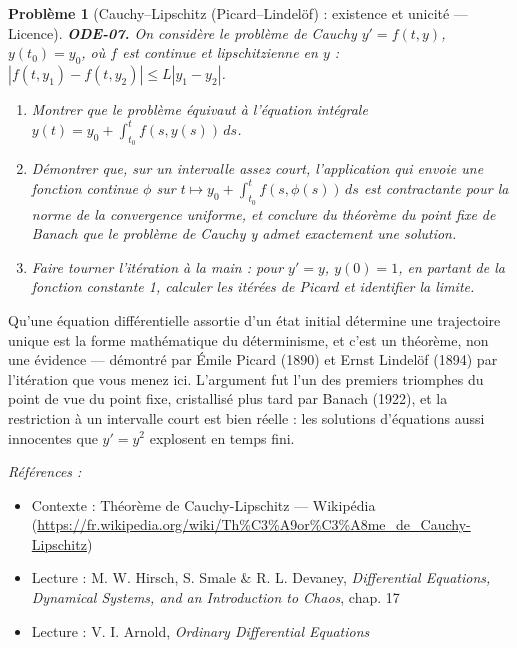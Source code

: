 \documentclass[11pt]{article}
\newtheorem{problem}{Problème}
\newenvironment{refs}{\par\small\noindent\emph{Références :}\begin{itemize}\setlength\itemsep{0pt}}{\end{itemize}\normalsize}
\begin{document}
\bigskip

\begin{problem}[{Cauchy--Lipschitz (Picard--Lindelöf) : existence et unicité --- Licence}]
\textbf{ODE-07.} On considère le problème de Cauchy $ y' = f(t, y) $,
$ y(t_0) = y_0 $, où $ f $ est continue et lipschitzienne en $ y $ :
$ |f(t, y_1) - f(t, y_2)| \le L |y_1 - y_2| $.
\begin{enumerate}
\item[(a)] Montrer que le problème équivaut à l'équation intégrale
$ y(t) = y_0 + \int_{t_0}^{t} f(s, y(s))\, ds $.
\item[(b)] Démontrer que, sur un intervalle assez court, l'application qui envoie une fonction continue
$ \phi $ sur $ t \mapsto y_0 + \int_{t_0}^{t} f(s, \phi(s))\, ds $ est contractante pour la
norme de la convergence uniforme, et conclure du théorème du point fixe de Banach que le problème
de Cauchy y admet exactement une solution.
\item[(c)] Faire tourner l'itération à la main : pour $ y' = y $, $ y(0) = 1 $, en partant de la
fonction constante 1, calculer les itérées de Picard et identifier la limite.
\end{enumerate}

\end{problem}

\noindent Qu'une équation différentielle assortie d'un état initial détermine une
trajectoire unique est la forme mathématique du déterminisme, et c'est un théorème, non une
évidence --- démontré par Émile Picard (1890) et Ernst Lindelöf (1894) par l'itération que vous
menez ici. L'argument fut l'un des premiers triomphes du point de vue du point fixe, cristallisé
plus tard par Banach (1922), et la restriction à un intervalle court est bien réelle : les
solutions d'équations aussi innocentes que $ y' = y^2 $ explosent en temps fini.

\begin{refs}
\item Contexte : Théorème de Cauchy-Lipschitz --- Wikipédia (\url{https://fr.wikipedia.org/wiki/Th%C3%A9or%C3%A8me_de_Cauchy-Lipschitz})
\item Lecture : M. W. Hirsch, S. Smale \& R. L. Devaney, \textit{Differential Equations, Dynamical Systems, and an Introduction to Chaos}, chap. 17
\item Lecture : V. I. Arnold, \textit{Ordinary Differential Equations}
\end{refs}

\bigskip
\end{document}
